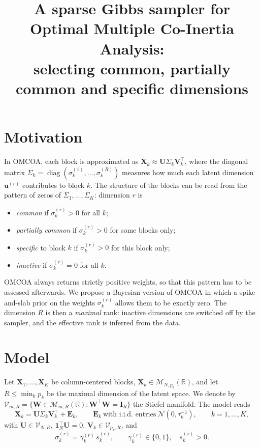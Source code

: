 \documentclass[11pt]{article}
\title{A sparse Gibbs sampler for Optimal Multiple Co-Inertia Analysis:\\
selecting common, partially common and specific dimensions}
\date{}
\DeclareMathOperator{\diag}{diag}
\newcommand{\X}{\mathbf{X}}
\newcommand{\U}{\mathbf{U}}
\newcommand{\V}{\mathbf{V}}
\newcommand{\EE}{\mathbf{E}}
\newcommand{\uu}{\mathbf{u}}
\newcommand{\I}{\mathbf{I}}
\newcommand{\one}{\mathbf{1}}
\newcommand{\Stiefel}[2]{\mathcal V_{#1,#2}}
\begin{document}
\maketitle

\section{Motivation}

In OMCOA, each block is approximated as $\X_k\approx\U\Sigma_k\V_k^\intercal$, where the diagonal matrix
$\Sigma_k=\diag(\sigma_k^{(1)},\ldots,\sigma_k^{(R)})$ measures how much each latent dimension $\uu^{(r)}$ contributes to
block $k$. The structure of the blocks can be read from the pattern of zeros of $\Sigma_1,\ldots,\Sigma_K$: dimension
$r$ is
\begin{itemize}
  \item \emph{common} if $\sigma_k^{(r)}>0$ for all $k$;
  \item \emph{partially common} if $\sigma_k^{(r)}>0$ for some blocks only;
  \item \emph{specific} to block $k$ if $\sigma_k^{(r)}>0$ for this block only;
  \item \emph{inactive} if $\sigma_k^{(r)}=0$ for all $k$.
\end{itemize}
OMCOA always returns strictly positive weights, so that this pattern has to be assessed afterwards. We propose
a Bayesian version of OMCOA in which a spike-and-slab prior on the weights $\sigma_k^{(r)}$ allows them to be exactly
zero. The dimension $R$ is then a \emph{maximal} rank: inactive dimensions are switched off by the sampler, and the
effective rank is inferred from the data.

\section{Model}

Let $\X_1,\ldots,\X_K$ be column-centered blocks, $\X_k\in\mathcal M_{N,p_k}(\mathbb R)$, and let $R\leq\min_kp_k$ be the
maximal dimension of the latent space. We denote by $\Stiefel{m}{R}=\{\mathbf W\in\mathcal M_{m,R}(\mathbb R):\mathbf W^\intercal\mathbf W=\I_R\}$
the Stiefel manifold. The model reads
\begin{equation}
  \X_k=\U\Sigma_k\V_k^\intercal+\EE_k,\qquad \EE_k\ \text{with i.i.d.\ entries}\ \mathcal N(0,\tau_k^{-1}),\qquad k=1,\ldots,K,
  \label{eq:model}
\end{equation}
with $\U\in\Stiefel{N}{R}$, $\one_N^\intercal\U=0$, $\V_k\in\Stiefel{p_k}{R}$, and
\begin{equation}
  \sigma_k^{(r)}=\gamma_k^{(r)}\,s_k^{(r)},\qquad \gamma_k^{(r)}\in\{0,1\},\quad s_k^{(r)}>0 .
  \label{eq:spike}
\end{equation}
\end{document}
